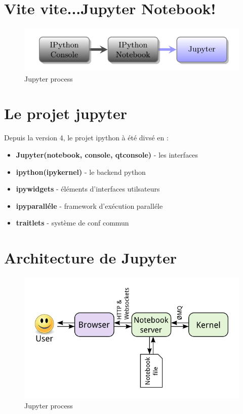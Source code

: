 \documentclass[11pt]{article}
\makeatletter
\def\maxwidth{\ifdim\Gin@nat@width>\linewidth\linewidth
    \else\Gin@nat@width\fi}
\let\Oldincludegraphics\includegraphics
\renewcommand{\includegraphics}[1]{\Oldincludegraphics[width=.8\maxwidth]{#1}}
\providecommand{\tightlist}{%
      \setlength{\itemsep}{0pt}\setlength{\parskip}{0pt}}
\makeatother
\begin{document}
    \section{Vite vite...Jupyter
Notebook!}\label{vite-vite...jupyter-notebook}

    \begin{figure}
\centering
\includegraphics{images/diag-1.png}
\caption{Jupyter process}
\end{figure}

    \section{Le projet jupyter}\label{le-projet-jupyter}

Depuis la version 4, le projet ipython à été divsé en :

\begin{itemize}
\tightlist
\item
  \textbf{Jupyter(notebook, console, qtconsole)} - les interfaces
\item
  \textbf{ipython(ipykernel)} - le backend python
\item
  \textbf{ipywidgets} - éléments d'interfaces utilsateurs
\item
  \textbf{ipyparalléle} - framework d'exécution paralléle
\item
  \textbf{traitlets} - système de conf commun
\end{itemize}

    \section{Architecture de Jupyter}\label{architecture-de-jupyter}

\begin{figure}
\centering
\includegraphics{images/notebook_components.png}
\caption{Jupyter process}
\end{figure}
\end{document}
